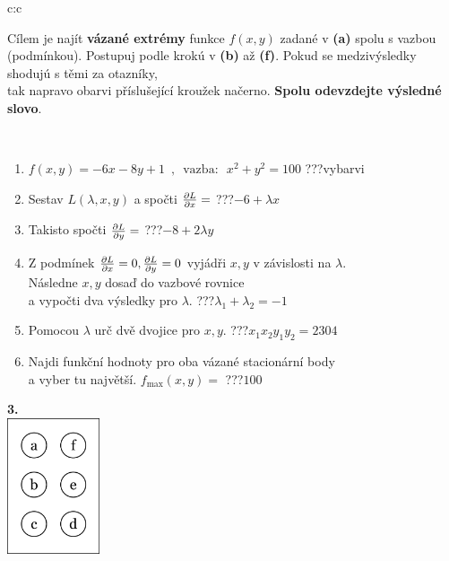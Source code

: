 \documentclass[10pt]{report}
\begin{document}
\begin{tabular}{c:c}
\begin{minipage}[c][104.5mm][t]{0.5\linewidth}
\begin{center}
\begin{minipage}{0.95\linewidth}
\begin{center}
Cílem je najít \textbf{vázané extrémy} funkce $f(x,y)$ zadané v \textbf{(a)} spolu s vazbou (podmínkou). Postupuj podle krokú v \textbf{(b)} až \textbf{(f)}. Pokud se medzivýsledky shodujú s těmi za otazníky,\\tak napravo obarvi příslušející kroužek načerno. \textbf{Spolu odevzdejte výsledné slovo}.
\end{center}
\end{minipage}
\\[1mm]
\begin{minipage}{0.79\linewidth}
\begin{center}
\begin{varwidth}{\linewidth}
\begin{enumerate}
\normalsize
\item $f(x,y)=-6x-8y+1 \enspace , \enspace \mathrm{vazba:} \enspace x^2+y^2=100$\quad \dotfill\; ???\;\dotfill \quad vybarvi
\item Sestav $L(\lambda,x,y)$ a spočti $\pdv{L}{x}=$\quad \dotfill\; ???\;\dotfill \quad $-6+\lambda x$
\item Takisto spočti $\pdv{L}{y}=$\quad \dotfill\; ???\;\dotfill \quad $-8+2\lambda y$
\item Z podmínek $\pdv{L}{x}=0 , \pdv{L}{y}=0$ vyjádři $x,y$ v závislosti na $\lambda$.\\ \phantom{xxxxxx}Následne $x,y$ dosaď do vazbové rovnice\\ \phantom{xxxxxx}a vypočti dva výsledky pro $\lambda$.\quad \dotfill\; ???\;\dotfill \quad $\lambda_1+\lambda_2=-1$
\item Pomocou $\lambda$ urč dvě dvojice pro $x,y$.\quad \dotfill\; ???\;\dotfill \quad $x_1 x_2 y_1 y_2=2304$
\item Najdi funkční hodnoty pro oba vázané stacionární body\\ \phantom{xxxxxx}a vyber tu najvětší. $f_{\text{max}}(x,y)=$\quad \dotfill\; ???\;\dotfill \quad $100$
\end{enumerate}
\end{varwidth}
\end{center}
\end{minipage}
\begin{minipage}{0.20\linewidth}
\begin{center}
{\Huge\bfseries 3.} \\[2mm]
\includegraphics[height=40mm]{../images/braille.png}

\end{center}
\end{minipage}
\end{center}
\end{minipage}
\end{tabular}
\end{document}
